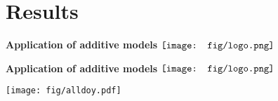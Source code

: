 \documentclass{beamer}
\begin{document}
\section{Results}

\begin{frame}{\textbf{Application of additive models} \hspace{0pt plus 1 filll} $\vcenter{\hbox{\texttt{[image: fig/logo.png]}}}$}
\vspace{-0.2in}
\begin{center}
\end{center}
\end{frame}

\begin{frame}{\textbf{Application of additive models} \hspace{0pt plus 1 filll} $\vcenter{\hbox{\texttt{[image: fig/logo.png]}}}$}
\vspace{-0.15in}
\begin{center}
\texttt{[image: fig/alldoy.pdf]}
\end{center}
\end{frame}
\end{document}
